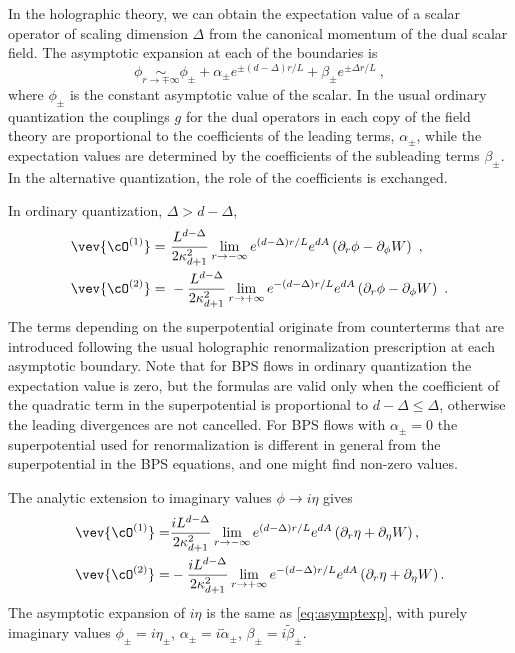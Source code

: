 In the holographic theory, we can obtain the expectation value of a scalar operator of scaling dimension $\Delta$ from the canonical momentum of the dual scalar field. The asymptotic expansion at each of the boundaries is
\begin{equation}\label{eq:asymptexp}
	\phi\underset{r\to \mp\infty}{\sim} \phi_\pm+\alpha_\pm e^{\pm(d-\Delta) r/L}+\beta_\pm e^{\pm \Delta r/L}\ ,
\end{equation}
where $\phi_\pm$ is the constant asymptotic value of the scalar. In the usual ordinary quantization the couplings $g$ for the dual operators in each copy of the field theory are proportional to the coefficients of the leading terms, $\alpha_\pm$, while the expectation values are determined by the coefficients of the subleading terms $\beta_\pm$. In the alternative quantization, the role of the coefficients is exchanged.

In ordinary quantization, $\Delta>d-\Delta$,
\begin{equation}\label{eq:vevordquant}
\begin{split}
	\vev{\cO^{(1)}}=&\ \frac{L^{d-\Delta}}{2\kappa^2_{d+1}}\lim_{r\to -\infty} e^{(d-\Delta)r/L}e^{dA}\left(\partial_r\phi-\partial_\phi W\right)\ ,\\
	\vev{\cO^{(2)}}=&\ -\frac{L^{d-\Delta}}{2\kappa^2_{d+1}}\lim_{r\to +\infty} e^{-(d-\Delta)r/L}e^{dA}\left(\partial_r\phi-\partial_\phi W\right)\ .
\end{split}
\end{equation}
The terms depending on the superpotential originate from counterterms that are introduced following the usual holographic renormalization prescription at each asymptotic boundary. Note that for BPS flows in ordinary quantization the expectation value is zero, but the formulas are valid only when the coefficient of the quadratic term in the superpotential is proportional to $d-\Delta\leq \Delta$, otherwise the leading divergences are not cancelled. For BPS flows with $\alpha_\pm=0$ the superpotential used for renormalization is different in general from the superpotential in the BPS equations, and one might find non-zero values. 

The analytic extension to imaginary values $\phi\to i\eta$ gives
\begin{equation}\label{eq:vevordquantIm}
\begin{split}
	\vev{\cO^{(1)}}=&\frac{iL^{d-\Delta}}{2\kappa^2_{d+1}}\lim_{r\to -\infty} e^{(d-\Delta)r/L}e^{dA}\left(\partial_r\eta+\partial_\eta W\right),\\
	\vev{\cO^{(2)}}=&-\frac{iL^{d-\Delta}}{2\kappa^2_{d+1}}\lim_{r\to +\infty} e^{-(d-\Delta)r/L}e^{dA}\left(\partial_r\eta+\partial_\eta W\right).
\end{split}
\end{equation}
The asymptotic expansion of $i\eta$ is the same as \eqref{eq:asymptexp}, with purely imaginary values $\phi_\pm=i \eta_\pm$, $\alpha_\pm=i \tilde\alpha_\pm$, $\beta_\pm=i\tilde\beta_\pm$.


